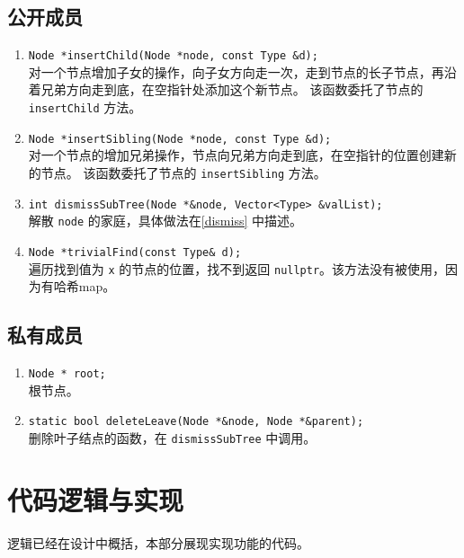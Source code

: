 {
\subsection{公开成员}
\begin{enumerate}
    \item \lstinline{Node *insertChild(Node *node, const Type &d);}\\
          对一个节点增加子女的操作，向子女方向走一次，走到节点的长子节点，再沿着兄弟方向走到底，在空指针处添加这个新节点。%
          该函数委托了节点的 \lstinline{insertChild} 方法。
    \item \lstinline{Node *insertSibling(Node *node, const Type &d);}\\
          对一个节点的增加兄弟操作，节点向兄弟方向走到底，在空指针的位置创建新的节点。%
          该函数委托了节点的 \lstinline{insertSibling} 方法。
    \item \lstinline{int dismissSubTree(Node *&node, Vector<Type> &valList);} \\
          解散 \lstinline{node} 的家庭，具体做法在\ref{dismiss} 中描述。
    \item \lstinline{Node *trivialFind(const Type& d);} \\
          遍历找到值为 \lstinline{x} 的节点的位置，找不到返回 \lstinline{nullptr}。该方法没有被使用，因为有哈希map。
\end{enumerate}

\subsection{私有成员}
\begin{enumerate}
    \item \lstinline{Node * root;} \\
          根节点。
    \item \lstinline{static bool deleteLeave(Node *&node, Node *&parent);} \\
          删除叶子结点的函数，在 \lstinline{dismissSubTree} 中调用。
\end{enumerate}
}

\section{代码逻辑与实现}

逻辑已经在设计中概括，本部分展现实现功能的代码。

